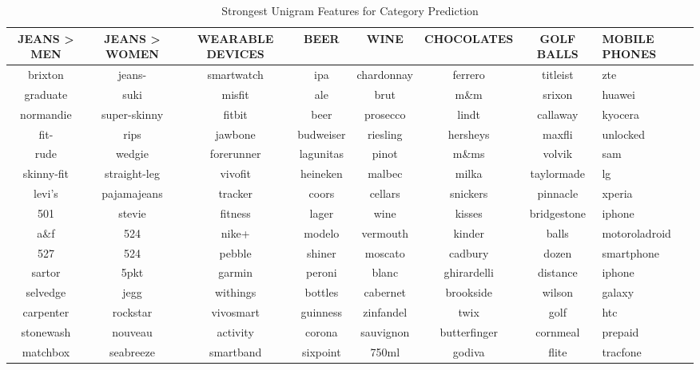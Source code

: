 
\begin{table}
  \caption{Strongest Unigram Features for Category Prediction}
  \label{tab:features}
  \begin{tabular}{cccccccl}
    \toprule
    JEANS > MEN	&	JEANS > WOMEN	&	WEARABLE DEVICES	&	 BEER	&	 WINE	&	CHOCOLATES	&	 GOLF BALLS	 & MOBILE PHONES \\
    \midrule
    brixton	&	jeans-	&	smartwatch	&	ipa	&	chardonnay	&	ferrero	&	titleist	&	zte	\\
    graduate	&	suki	&	misfit	&	ale	&	brut	&	m\&m	&	srixon	&	huawei	\\
    normandie	&	super-skinny	&	fitbit	&	beer	&	prosecco	&	lindt	&	callaway	&	kyocera	\\
    fit-	&	rips	&	jawbone	&	budweiser	&	riesling	&	hersheys	&	maxfli	&	unlocked	\\
    rude	&	wedgie	&	forerunner	&	lagunitas	&	pinot	&	m\&ms	&	volvik	&	sam	\\
    skinny-fit	&	straight-leg &	vivofit	&	heineken	&	malbec	&	milka	&	taylormade	&	lg	\\
    levi's\textregistered	&	pajamajeans	&	tracker	&	coors	&	cellars	&	snickers	&	pinnacle	&	xperia	\\
    501	&	stevie	&	fitness	&	lager	&	wine	&	kisses	&	bridgestone	&	iphone	\\
    a\&f	&	524\texttrademark	&	nike+	&	modelo	&	vermouth	&	kinder	&	balls	&	motoroladroid	\\
    527	&	524	&	pebble	&	shiner	&	moscato	&	cadbury	&	dozen	&	smartphone	\\
    sartor	&	5pkt	&	garmin	&	peroni	&	blanc	&	ghirardelli	&	distance	&	 iphone\textregistered	\\
    selvedge	&	jegg	&	withings	&	bottles	&	cabernet	&	brookside	&	wilson	&	galaxy	\\
    carpenter	&	rockstar	&	vivosmart	&	guinness	&	zinfandel	&	twix	&	golf	&	htc	\\
    stonewash	&	nouveau	&	activity	&	corona	&	sauvignon	&	butterfinger	&	cornmeal	&	prepaid	\\
    matchbox	&	seabreeze	&	smartband	&	sixpoint	&	750ml	&	godiva	&	flite	&	tracfone \\
    \bottomrule
  \end{tabular}
\end{table}


